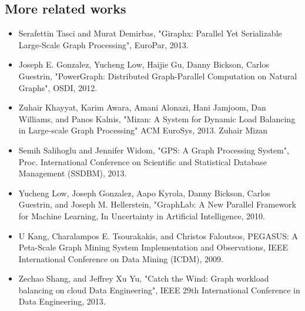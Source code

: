 \subsection{More related works}
\begin{frame}
\begin{itemize}

\item Serafettin Tasci and Murat Demirbas, "Giraphx: Parallel Yet Serializable Large-Scale Graph Processing", EuroPar, 2013. 
\item Joseph E. Gonzalez, Yucheng Low, Haijie Gu, Danny Bickson, Carlos Guestrin, "PowerGraph: Distributed Graph-Parallel Computation on Natural Graphs", OSDI, 2012.     
\item Zuhair Khayyat, Karim Awara, Amani Alonazi, Hani Jamjoom, Dan Williams, and Panos Kalnis, "Mizan: A System for Dynamic Load Balancing in Large-scale Graph Processing" ACM EuroSys, 2013. 
Zuhair Mizan 
    \end{itemize}
\end{frame}
 
\begin{frame}
\begin{itemize}
\item Semih Salihoglu and Jennifer Widom, "GPS: A Graph Processing System", Proc. International Conference on Scientific and Statistical Database Management (SSDBM), 2013.
 \item Yucheng Low, Joseph Gonzalez, Aapo Kyrola, Danny Bickson, Carlos Guestrin, and Joseph M. Hellerstein, "GraphLab: A New Parallel Framework for Machine Learning, In Uncertainty in Artificial Intelligence, 2010.
\item U Kang, Charalampos E. Tsourakakis, and Christos Faloutsos, PEGASUS: A Peta-Scale Graph Mining System Implementation and Observations, IEEE International Conference on Data Mining (ICDM), 2009.
    \end{itemize}
\end{frame}


\begin{frame}
\begin{itemize}
\item Zechao Shang, and Jeffrey Xu Yu, "Catch the Wind: Graph workload balancing on cloud Data Engineering", IEEE 29th International Conference in Data Engineering, 2013.
    \end{itemize}
\end{frame}